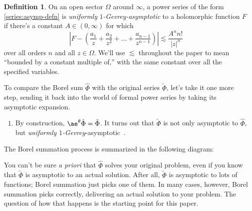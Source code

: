 \documentclass{article}
\theoremstyle{definition}
\newtheorem{defn}{Definition}
\newcommand{\series}[1]{\tilde{#1}}
\newcommand{\laplace}{\mathcal{L}}
\newcommand{\borel}{\mathcal{B}}
\newcommand{\aexp}{\ae}
\begin{document}
\begin{defn}\label{def:unif-gevrey-asymp}
On an open sector $\Omega$ around $\infty$, a power series of the form \eqref{series:asymp-defn} is {\em uniformly $1$-Gevrey-asymptotic} to a holomorphic function $F$ if there's a constant $A \in (0, \infty)$ for which
\[ \left|F - \left(\frac{a_1}{z} + \frac{a_2}{z^2} + \ldots + \frac{a_{n-1}}{z^{n-1}} \right) \right| \lesssim \frac{A^n n!}{|z|^n} \]
over all orders $n$ and all $z \in \Omega$. We'll use $\lesssim$ throughout the paper to mean ``bounded by a constant multiple of,'' with the same constant over all the specified variables.
\end{defn}
To compare the Borel sum $\hat{\Phi}$ with the original series $\series{\Phi}$, let's take it one more step, sending it back into the world of formal power series by taking its asymptotic expansion.

\begin{enumerate}[start=4]
\item By construction, $\aexp^\theta \hat{\Phi} = \series{\Phi}$. It turns out that $\series{\Phi}$ is not only asymptotic to $\hat{\Phi}$, but {\em {uniformly} $1$-Gevrey}-asymptotic~\cite[Corollary~5.23]{diverg-resurg-i}.
\end{enumerate}

The Borel summation process is summarized in the following diagram:
\begin{center}
\end{center}

You can't be sure {\em a priori} that $\hat{\Phi}$ solves your original problem, even if you know that $\series{\Phi}$ is asymptotic to an actual solution. After all, $\series{\Phi}$ is asymptotic to lots of functions; Borel summation just picks one of them. In many cases, however, Borel summation picks correctly, delivering an actual solution to your problem. The question of how that happens is the starting point for this paper.
\end{document}
